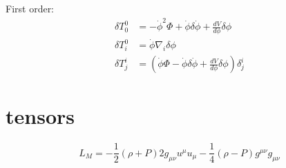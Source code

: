 First order:
\begin{align}
  \delta T^{0}_{0} &= -\dot{\phi}^2\Phi + \dot{\phi}\delta\dot{\phi} + \frac{dV}{d\phi} \delta\phi \\
  \delta T^{0}_{i} &= \dot{\phi}\nabla_i\delta\phi\\
  \delta T^{i}_{j} &= \left( \dot{\phi}\Phi-\dot{\phi}\delta\dot{\phi}+\frac{dV}{d\phi} \delta\phi \right)\delta^{i}_{j}
\end{align}

\section{tensors}

\begin{equation}
  L_M = -\frac{1}{2}(\rho+P)2g_{\mu\nu}u^\mu u_\mu -\frac{1}{4}(\rho-P)g^{\mu\nu} g_{\mu\nu}
\end{equation}
